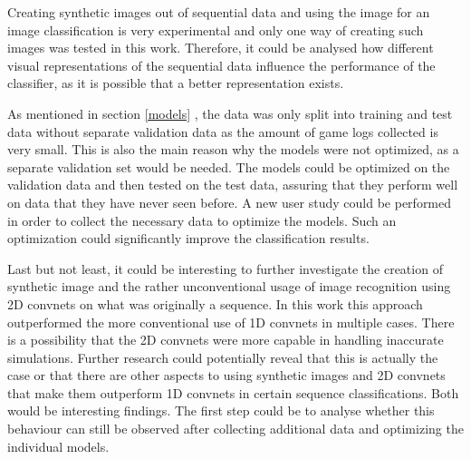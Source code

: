 Creating synthetic images out of sequential data and using the image for an image classification is very experimental and only one way of creating such images was tested in this work. Therefore, it could be analysed how different visual representations of the sequential data influence the performance of the classifier, as it is possible that a better representation exists. 

As mentioned in section \ref{models} , the data was only split into training and test data without separate validation data as the amount of game logs collected is very small. This is also the main reason why the models were not optimized, as a separate validation set would be needed. The models could be optimized on the validation data and then tested on the test data, assuring that they perform well on data that they have never seen before. A new user study could be performed in order to collect the necessary data to optimize the models. Such an optimization could significantly improve the classification results. 

Last but not least, it could be interesting to further investigate the creation of synthetic image and the rather unconventional usage of image recognition using 2D convnets on what was originally a sequence. In this work this approach outperformed the more conventional use of 1D convnets in multiple cases. There is a possibility that the 2D convnets were more capable in handling inaccurate simulations. Further research could potentially reveal that this is actually the case or that there are other aspects to using synthetic images and 2D convnets that make them outperform 1D convnets in certain sequence classifications. Both would be interesting findings. The first step could be to analyse whether this behaviour can still be observed after collecting additional data and optimizing the individual models.


